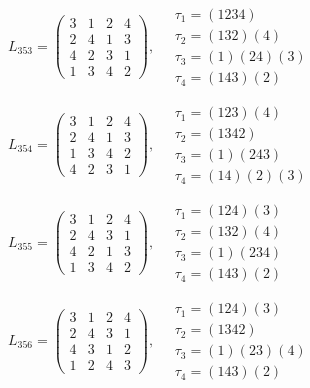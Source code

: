 $L_{353} = \begin{pmatrix} 3 & 1 & 2 & 4 \\ 2 & 4 & 1 & 3 \\ 4 & 2 & 3 & 1 \\ 1 & 3 & 4 & 2 \end{pmatrix}, \quad \begin{matrix} \tau_{1} = (1 2 3 4) \\ \tau_{2} = (1 3 2)(4) \\ \tau_{3} = (1)(2 4)(3) \\ \tau_{4} = (1 4 3)(2) \end{matrix}$

$L_{354} = \begin{pmatrix} 3 & 1 & 2 & 4 \\ 2 & 4 & 1 & 3 \\ 1 & 3 & 4 & 2 \\ 4 & 2 & 3 & 1 \end{pmatrix}, \quad \begin{matrix} \tau_{1} = (1 2 3)(4) \\ \tau_{2} = (1 3 4 2) \\ \tau_{3} = (1)(2 4 3) \\ \tau_{4} = (1 4)(2)(3) \end{matrix}$

$L_{355} = \begin{pmatrix} 3 & 1 & 2 & 4 \\ 2 & 4 & 3 & 1 \\ 4 & 2 & 1 & 3 \\ 1 & 3 & 4 & 2 \end{pmatrix}, \quad \begin{matrix} \tau_{1} = (1 2 4)(3) \\ \tau_{2} = (1 3 2)(4) \\ \tau_{3} = (1)(2 3 4) \\ \tau_{4} = (1 4 3)(2) \end{matrix}$

$L_{356} = \begin{pmatrix} 3 & 1 & 2 & 4 \\ 2 & 4 & 3 & 1 \\ 4 & 3 & 1 & 2 \\ 1 & 2 & 4 & 3 \end{pmatrix}, \quad \begin{matrix} \tau_{1} = (1 2 4)(3) \\ \tau_{2} = (1 3 4 2) \\ \tau_{3} = (1)(2 3)(4) \\ \tau_{4} = (1 4 3)(2) \end{matrix}$

